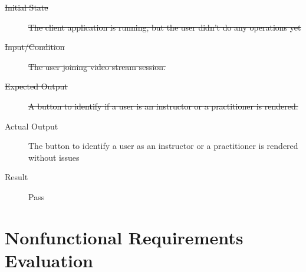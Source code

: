 \documentclass[12pt, titlepage]{article}
\begin{document}
\begin{enumerate}[FR-T1]
    \begin{description}
    \item[\sout{Initial State}]\sout{ The client application is running, but the user didn’t do
      any operations yet
    }\item[\sout{Input/Condition}]\sout{ The user joining video stream session.
    }\item[\sout{Expected Output}]\sout{ A button to identify if a user is an instructor or a
      practitioner is rendered.
    }\item[Actual Output] The button to identify a user as an instructor or a
      practitioner is rendered without issues
    \item[Result] Pass
    \end{description}
  \end{enumerate}

\section{Nonfunctional Requirements Evaluation}
\end{document}

